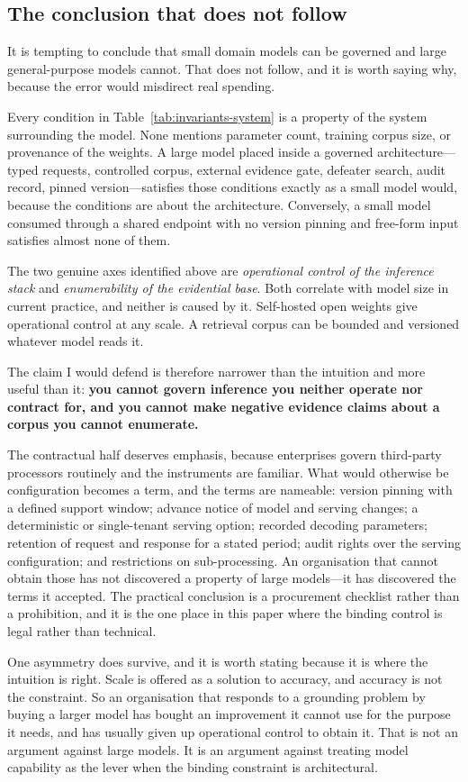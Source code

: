 \subsection{The conclusion that does not follow}
\label{sec:not-follow}

It is tempting to conclude that small domain models can be governed and large
general-purpose models cannot. That does not follow, and it is worth saying why,
because the error would misdirect real spending.

Every condition in Table~\ref{tab:invariants-system} is a property of the system
surrounding the model. None mentions parameter count, training corpus size, or
provenance of the weights. A large model placed inside a governed architecture---typed
requests, controlled corpus, external evidence gate, defeater search, audit record,
pinned version---satisfies those conditions exactly as a small model would, because the
conditions are about the architecture. Conversely, a small model consumed through a
shared endpoint with no version pinning and free-form input satisfies almost none of
them.

The two genuine axes identified above are \emph{operational control of the inference
stack} and \emph{enumerability of the evidential base}. Both correlate with model
size in current practice, and neither is caused by it. Self-hosted open weights give
operational control at any scale. A retrieval corpus can be bounded and versioned
whatever model reads it.

The claim I would defend is therefore narrower than the intuition and more useful
than it: \textbf{you cannot govern inference you neither operate nor contract for, and
you cannot make negative evidence claims about a corpus you cannot enumerate.}

The contractual half deserves emphasis, because enterprises govern third-party
processors routinely and the instruments are familiar. What would otherwise be
configuration becomes a term, and the terms are nameable: version pinning with a
defined support window; advance notice of model and serving changes; a deterministic or
single-tenant serving option; recorded decoding parameters; retention of request and
response for a stated period; audit rights over the serving configuration; and
restrictions on sub-processing. An organisation that cannot obtain those has not
discovered a property of large models---it has discovered the terms it accepted. The
practical conclusion is a procurement checklist rather than a prohibition, and it is
the one place in this paper where the binding control is legal rather than technical.

One asymmetry does survive, and it is worth stating because it is where the intuition
is right. Scale is offered as a solution to accuracy, and accuracy is not the
constraint. So an organisation that responds to a grounding problem by buying a larger
model has bought an improvement it cannot use for the purpose it needs, and has
usually given up operational control to obtain it. That is not an argument against
large models. It is an argument against treating model capability as the lever when
the binding constraint is architectural.
